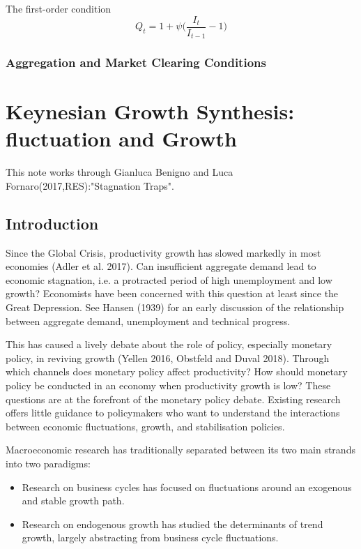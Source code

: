 \documentclass[10pt,math=newtx,citestyle=gb7714-2015,bibstyle=gb7714-2015]{elegantbook}
\begin{document}
{{{			The first-order condition
			\begin{equation}
				Q_t=1+\psi\bigg(\frac{I_t}{I_{t-1}}-1\bigg)
			\end{equation}
			
			
			\subsection{Aggregation and Market Clearing Conditions}
			
	\chapter{Keynesian Growth Synthesis: fluctuation and Growth}

    This note works through Gianluca Benigno and Luca Fornaro(2017,RES):"Stagnation Traps".
	\section{Introduction}
	Since the Global Crisis, productivity growth has slowed markedly in most economies (Adler et al. 2017). Can insufficient aggregate demand lead to economic stagnation, i.e. a protracted period of high unemployment and low growth? Economists have been concerned with this question at least since the Great Depression. See Hansen (1939) for an early discussion of the relationship between aggregate demand, unemployment and technical progress. 
	
	This has caused a lively debate about the role of policy, especially monetary policy, in reviving growth (Yellen 2016, Obstfeld and Duval 2018). Through which channels does monetary policy affect productivity? How should monetary policy be conducted in an economy when productivity growth is low? These questions are at the forefront of the monetary policy debate. Existing research offers little guidance to policymakers who want to understand the interactions between economic fluctuations, growth, and stabilisation policies. 
	
	Macroeconomic research has traditionally separated between its two main strands into two paradigms:
	
	\begin{itemize}
		\item Research on business cycles has focused on fluctuations around an exogenous and stable growth path.
		\item Research on endogenous growth has studied the determinants of trend growth, largely abstracting from business cycle fluctuations.
	\end{itemize}

}}}
\end{document}
